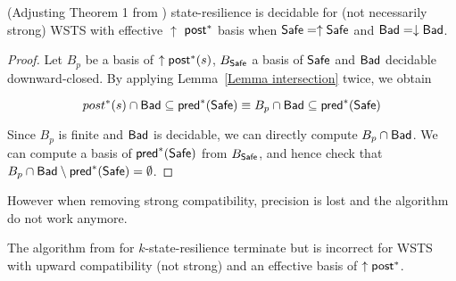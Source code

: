 \begin{theorem}{(Adjusting Theorem 1 from \cite{DBLP:journals/corr/abs-2108-00889})}\label{post srp}
{\sc state-resilience} is decidable for (not necessarily strong) WSTS with effective 
$\uparrow$ $\textsf{post}^*$ basis
when
$\textsf{Safe}=\uparrow \textsf{Safe}$
and $\textsf{Bad}=\downarrow \textsf{Bad}$.
\end{theorem}


\begin{proof}
Let $B_p$ be a basis of $\uparrow \textsf{post}^*(s)$, $B_{\textsf{Safe}}$ a basis of $\textsf{Safe}$
and $\textsf{Bad}$ decidable downward-closed.
By applying Lemma~\ref{Lemma intersection} twice, we obtain

$$ post^*(s) \cap \textsf{Bad} \subseteq \textsf{pred}^*(\textsf{Safe}) \equiv B_p \cap \textsf{Bad} \subseteq \textsf{pred}^*(\textsf{Safe})$$


Since $B_p$ is finite and $\textsf{Bad}$ is decidable, we can directly compute $ B_p \cap \textsf{Bad}$.
We can compute a basis of $\textsf{pred}^*(\textsf{Safe})$ from $B_{\textsf{Safe}}$, and hence check that $B_p \cap \textsf{Bad} \setminus \textsf{pred}^*(\textsf{Safe}) = \emptyset$. 
\end{proof}

%
%



However when removing strong compatibility, precision is lost and the algorithm do not work anymore.

\begin{proposition}
The algorithm from \cite{DBLP:conf/gg/Ozkan22} for {\sc $k$-state-resilience} terminate but is incorrect for WSTS with upward compatibility (not strong) and an effective basis of $\uparrow \textsf{post}^*$.
\end{proposition}

